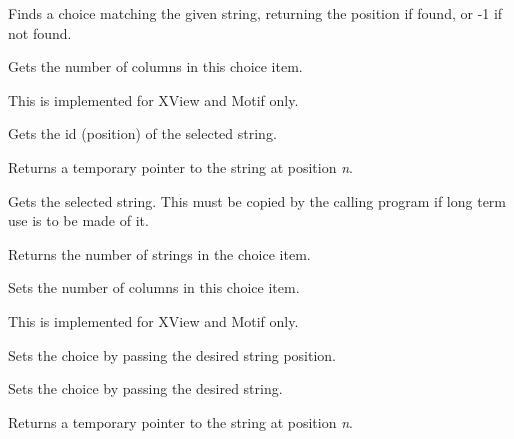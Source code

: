 Finds a choice matching the given string, returning the position if found, or
-1 if not found.



Gets the number of columns in this choice item.

This is implemented for XView and Motif only.



Gets the id (position) of the selected string.



Returns a temporary pointer to the string at position {\it n}.



Gets the selected string. This must be copied by the calling program
if long term use is to be made of it.



Returns the number of strings in the choice item.



Sets the number of columns in this choice item.

This is implemented for XView and Motif only.



Sets the choice by passing the desired string position. 



Sets the choice by passing the desired string.



Returns a temporary pointer to the string at position {\it n}.

